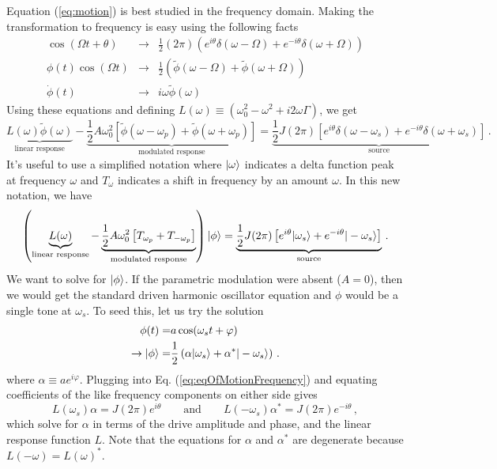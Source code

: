 Equation (\ref{eq:motion}) is best studied in the frequency domain.
Making the transformation to frequency is easy using the following facts \begin{eqnarray}
\cos(\Omega t + \theta) &\rightarrow& \frac{1}{2}(2\pi)\left(e^{i \theta}\delta(\omega - \Omega) + e^{-i \theta} \delta(\omega + \Omega) \right) \nonumber \\
\phi(t)\cos(\Omega t) &\rightarrow& \frac{1}{2}\left( \tilde{\phi}(\omega-\Omega) + \tilde{\phi}(\omega+\Omega) \right) \nonumber \\
\dot{\phi}(t) &\rightarrow& i\omega \tilde{\phi}(\omega) \nonumber \end{eqnarray}
Using these equations and defining $L(\omega) \equiv (\omega_0^2 - \omega^2 +i2\omega\Gamma)$, we get
\begin{equation*}
  \underbrace{L(\omega) \tilde{\phi}(\omega)}_{\text{linear response}}
  - \underbrace{\frac{1}{2} A \omega_0^2 \left[ \tilde{\phi}(\omega - \omega_p) + \tilde{\phi}(\omega + \omega_p) \right]}_{\text{modulated response}}
  = \underbrace{\frac{1}{2}J(2\pi)\left[e^{i \theta}\delta(\omega-\omega_s) + e^{-i\theta}\delta(\omega+\omega_s) \right]}_{\text{source}} \, .
\end{equation*}
It's useful to use a simplified notation where $| \omega \rangle$ indicates a delta function peak at frequency $\omega$ and $T_{\omega}$ indicates a shift in frequency by an amount $\omega$.
In this new notation, we have
\begin{equation}
  \left(
      \underbrace{L(\omega)}_{\text{linear response}}
    - \underbrace{
        \frac{1}{2} A \omega_0^2
        \left[
          T_{\omega_p} + T_{-\omega_p}
        \right]
      }_{\text{modulated response}}
  \right) | \phi \rangle
  = \underbrace{\frac{1}{2} J (2\pi) \left[e^{i \theta} | \omega_s \rangle + e^{-i \theta} | -\omega_s \rangle \right]}_{\text{source}}
  \, . \label{eq:eqOfMotionFrequency}
\end{equation}
We want to solve for $| \phi \rangle$.
If the parametric modulation were absent ($A=0$), then we would get the standard driven harmonic oscillator equation and $\phi$ would be a single tone at $\omega_s$.
To seed this, let us try the solution
\begin{align*}
  \phi(t) =& a \cos(\omega_s t + \varphi) \\
  \rightarrow | \phi \rangle =& \frac{1}{2} \left( \alpha | \omega_s \rangle + \alpha^* | -\omega_s \rangle \right) \, .
\end{align*}
where $\alpha \equiv a e^{i \varphi}$.
Plugging into Eq. (\ref{eq:eqOfMotionFrequency}) and equating coefficients of the like frequency components on either side gives
\begin{displaymath}
  L(\omega_s) \alpha = J (2 \pi) e^{i \theta}
  \qquad \text{and} \qquad
  L(-\omega_s) \alpha^* = J (2 \pi) e^{-i \theta} \, ,
\end{displaymath}
which solve for $\alpha$ in terms of the drive amplitude and phase, and the linear response function $L$.
Note that the equations for $\alpha$ and $\alpha^*$ are degenerate because $L(-\omega) = L(\omega)^*$.

